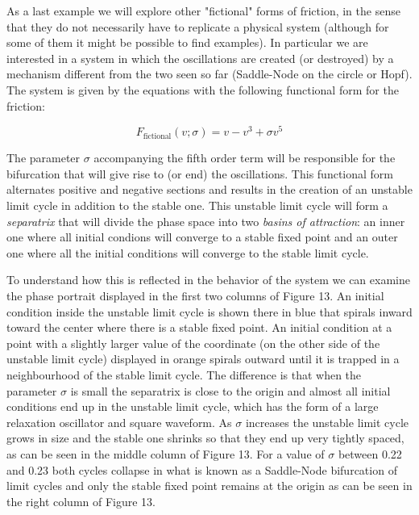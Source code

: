 \documentclass{article}
\begin{document}
As a last example we will explore other "fictional" forms of friction, in the sense that they do not necessarily have to replicate a physical system (although for some of them it might be possible to find examples). 
In particular we are interested in a system in which the oscillations are created (or destroyed) by a mechanism different from the two seen so far (Saddle-Node on the circle or Hopf). 
The system is given by the equations with the following functional form for the friction:

\begin{equation} \label{eq_fictional}
    F_{\text{fictional}}(v;\sigma) = v - v^3 + \sigma v^5  
\end{equation}

The parameter $\sigma$ accompanying the fifth order term will be responsible for the bifurcation that will give rise to (or end) the oscillations.
This functional form alternates positive and negative sections and results in the creation of an unstable limit cycle in addition to the stable one. 
This unstable limit cycle will form a {\em separatrix} that will divide the phase space into two {\em basins of attraction}: an inner one where all initial condions will converge to a stable fixed point and an outer one where all the initial conditions will converge to the stable limit cycle. 

To understand how this is reflected in the behavior of the system we can examine the phase portrait displayed in the first two columns of Figure 13. 
An initial condition inside the unstable limit cycle is shown there in blue that spirals inward toward the center where there is a stable fixed point. 
An initial condition at a point with a slightly larger value of the coordinate (on the other side of the unstable limit cycle) displayed in orange spirals outward until it is trapped in a neighbourhood of the stable limit cycle. 
The difference is that when the parameter $\sigma$ is small the separatrix is close to the origin and almost all initial conditions end up in the unstable limit cycle, which has the form of a large relaxation oscillator and square waveform. 
As $\sigma$ increases the unstable limit cycle grows in size and the stable one shrinks so that they end up very tightly spaced, as can be seen in the middle column of Figure 13. 
For a value of $\sigma$ between 0.22 and 0.23 both cycles collapse in what is known as a Saddle-Node bifurcation of limit cycles and only the stable fixed point remains at the origin as can be seen in the right column of Figure 13. 
\end{document}
